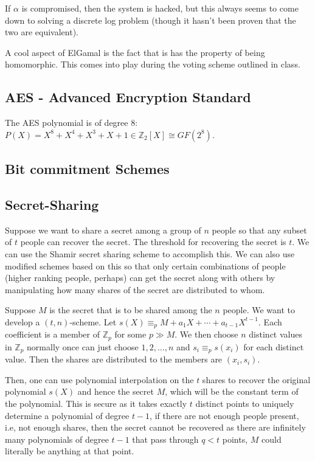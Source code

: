 \documentclass[12pt,a4paper]{article}
\begin{document}
If $\alpha$ is compromised, then the system is hacked, but this always seems to come down to solving a discrete log problem (though it hasn't been proven that the two are equivalent). 

A cool aspect of ElGamal is the fact that is has the property of being homomorphic. This comes into play during the voting scheme outlined in class. 

\subsection{AES - Advanced Encryption Standard}
The AES polynomial is of degree 8: $P(X) = X^{8} + X^{4} + X^{3} + X + 1 \in \mathbb{Z}_{2}[X] \cong GF(2^{8})$. 

\subsection{Bit commitment Schemes}

\subsection{Secret-Sharing}
Suppose we want to share a secret among a group of $n$ people so that any subset of $t$ people can recover the secret. The threshold for recovering the secret is $t$. We can use the Shamir secret sharing scheme to accomplish this. We can also use modified schemes based on this so that only certain combinations of people (higher ranking people, perhaps) can get the secret along with others by manipulating how many shares of the secret are distributed to whom.  

Suppose $M$ is the secret that is to be shared among the $n$ people. We want to develop a $(t,n)$-scheme. Let $s(X) \equiv_{p} M + a_{1}X + \cdots + a_{t-1}X^{t-1}$. Each coefficient is a member of $\mathbb{Z}_{p}$ for some $p \gg M$. We then choose $n$ distinct values in $\mathbb{Z}_{p}$ normally once can just choose $1, 2, \ldots, n$ and $s_{i} \equiv_{p} s(x_{i})$ for each distinct value. Then the shares are distributed to the members are $\left(x_{i}, s_{i}\right)$. 

Then, one can use polynomial interpolation on the $t$ shares to recover the original polynomial $s(X)$ and hence the secret $M$, which will be the constant term of the polynomial. This is secure as it takes exactly $t$ distinct points to uniquely determine a polynomial of degree $t-1$, if there are not enough people present, i.e, not enough shares, then the secret cannot be recovered as there are infinitely many polynomials of degree $t-1$ that pass through $q < t$ points, $M$ could literally be anything at that point. 
\end{document}

